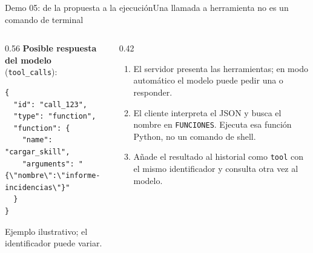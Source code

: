 \begin{frame}[fragile]{Demo 05: de la propuesta a la ejecución}{Una llamada a herramienta no es un comando de terminal}
	\begin{columns}[T]
		\begin{column}{0.56\textwidth}
			{\footnotesize\textbf{Posible respuesta del modelo} (\texttt{tool\_calls}):}
			\begin{lstlisting}[language={}]
{
  "id": "call_123",
  "type": "function",
  "function": {
    "name": "cargar_skill",
    "arguments": "{\"nombre\":\"informe-incidencias\"}"
  }
}
\end{lstlisting}
			{\scriptsize Ejemplo ilustrativo; el identificador puede variar.}
		\end{column}
		\begin{column}{0.42\textwidth}
			\footnotesize
			\begin{enumerate}
				\setlength{\itemsep}{1pt}
				\item El servidor presenta las herramientas; en modo automático el modelo puede pedir una o responder.
				\item El cliente interpreta el JSON y busca el nombre en \texttt{FUNCIONES}. Ejecuta esa función Python, no un comando de shell.
				\item Añade el resultado al historial como \texttt{tool} con el mismo identificador y consulta otra vez al modelo.
			\end{enumerate}
		\end{column}
	\end{columns}
\end{frame}


